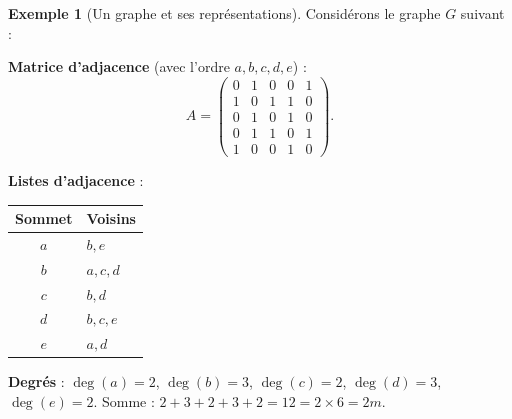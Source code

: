 \documentclass[12pt,a4paper,openany]{book}
\theoremstyle{definition}
\newtheorem{exemple}[definition]{Exemple}
\theoremstyle{plain}
\theoremstyle{remark}
\begin{document}
\begin{exemple}[Un graphe et ses représentations]
\label{ex:graphe-representations}
Considérons le graphe $G$ suivant :

\begin{center}
\end{center}

\textbf{Matrice d'adjacence} (avec l'ordre $a, b, c, d, e$) :
\[
  A = \begin{pmatrix}
    0 & 1 & 0 & 0 & 1 \\
    1 & 0 & 1 & 1 & 0 \\
    0 & 1 & 0 & 1 & 0 \\
    0 & 1 & 1 & 0 & 1 \\
    1 & 0 & 0 & 1 & 0
  \end{pmatrix}.
\]

\textbf{Listes d'adjacence} :
\begin{center}
\begin{tabular}{@{}cl@{}}
\toprule
\textbf{Sommet} & \textbf{Voisins} \\
\midrule
$a$ & $b, e$ \\
$b$ & $a, c, d$ \\
$c$ & $b, d$ \\
$d$ & $b, c, e$ \\
$e$ & $a, d$ \\
\bottomrule
\end{tabular}
\end{center}

\textbf{Degrés} : $\deg(a) = 2$, $\deg(b) = 3$, $\deg(c) = 2$, $\deg(d) = 3$,
$\deg(e) = 2$. Somme : $2+3+2+3+2 = 12 = 2 \times 6 = 2m$. \checkmark
\end{exemple}
\end{document}
